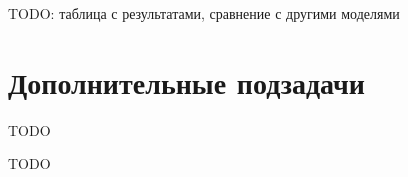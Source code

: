\documentclass[times,specification,annotation]{itmo-student-thesis}
\begin{document}
TODO: таблица с результатами, сравнение с другими моделями

\section{Дополнительные подзадачи}

TODO

\startconclusionpage

TODO

\printmainbibliography

\appendix
\end{document}
